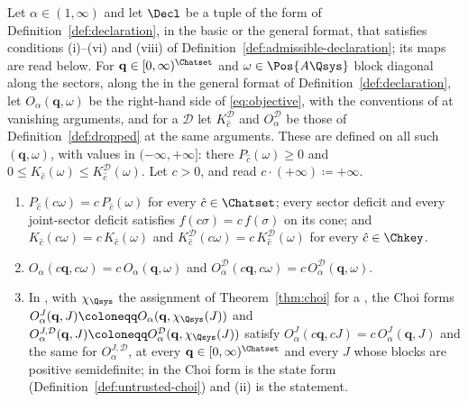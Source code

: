 \begin{lemma}\label{lem:objective-homogeneous}
Let $\alpha\in(1,\infty)$ and let $\Decl$ be a tuple of the form of
Definition~\ref{def:declaration}, in the basic or the general format, that
satisfies conditions (i)--(vi) and (viii) of
Definition~\ref{def:admissible-declaration}; its maps are read below. For
$\mathbf q\in[0,\infty)^{\Chatset}$ and
$\omega\in\Pos{A\Qsys}$ block diagonal along the sectors, along the
 in the general format of
Definition~\ref{def:declaration}, let $O_{\alpha}(\mathbf q,\omega)$ be the
right-hand side of \eqref{eq:objective}, with the conventions of
 at vanishing arguments, and for a
 $\mathcal{D}$ let $K^{\mathcal{D}}_{\hat c}$ and
$O^{\mathcal{D}}_{\alpha}$ be those of Definition~\ref{def:dropped} at the
same arguments. These are defined on all such $(\mathbf q,\omega)$, with
values in $(-\infty,+\infty]$: there $P_{\hat c}(\omega)\ge0$ and
$0\le K_{\hat c}(\omega)\le K^{\mathcal{D}}_{\hat c}(\omega)$. Let $c>0$,
and read $c\cdot(+\infty)\coloneqq+\infty$.
\begin{enumerate}[label=(\roman*),leftmargin=2.4em]
\item $P_{\hat c}(c\omega)=c\,P_{\hat c}(\omega)$ for every
  $\hat c\in\Chatset$; every sector deficit and every joint-sector deficit
  satisfies $f(c\sigma)=c\,f(\sigma)$ on its cone; and
  $K_{\hat c}(c\omega)=c\,K_{\hat c}(\omega)$ and
  $K^{\mathcal{D}}_{\hat c}(c\omega)=c\,K^{\mathcal{D}}_{\hat c}(\omega)$ for
  every $\hat c\in\Chkey$.
\item $O_{\alpha}(c\mathbf q,c\omega)=c\,O_{\alpha}(\mathbf q,\omega)$ and
  $O^{\mathcal{D}}_{\alpha}(c\mathbf q,c\omega)
  =c\,O^{\mathcal{D}}_{\alpha}(\mathbf q,\omega)$.
\item In , with $\chi_{\Qsys}$ the assignment of
  Theorem~\ref{thm:choi} for a , the Choi forms
  $O^{J}_{\alpha}(\mathbf q,J)\coloneqq O_{\alpha}(\mathbf q,\chi_{\Qsys}(J))$
  and $O^{J,\mathcal{D}}_{\alpha}(\mathbf q,J)\coloneqq
  O^{\mathcal{D}}_{\alpha}(\mathbf q,\chi_{\Qsys}(J))$ satisfy
  $O^{J}_{\alpha}(c\mathbf q,cJ)=c\,O^{J}_{\alpha}(\mathbf q,J)$ and the same
  for $O^{J,\mathcal{D}}_{\alpha}$, at every $\mathbf q\in[0,\infty)^{\Chatset}$
  and every $J$ whose blocks are positive semidefinite; in
   the Choi form is the state form
  (Definition~\ref{def:untrusted-choi}) and (ii) is the statement.
\end{enumerate}
\end{lemma}

